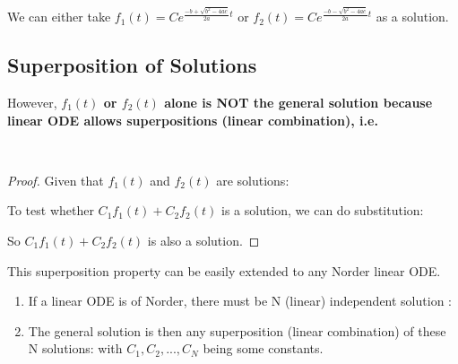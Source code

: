 \documentclass[class=article, crop=false, 12pt]{standalone}
\begin{document}
We can either take $f_1(t) = Ce^{\frac{-b+ \sqrt{b^2-4ac}}{2a} t}$ or 
$f_2(t) = Ce^{\frac{-b- \sqrt{b^2-4ac}}{2a} t}$ as a solution. 

\subsection{Superposition of Solutions}

However, \bf{$f_1(t)$ or $f_2(t)$ alone is NOT the general solution}
because linear ODE allows superpositions (linear combination), i.e. 
\begin{center}
\end{center}

\hfill\\[-3em]

\begin{proof}
    Given that $f_1(t)$ and $f_2(t)$ are solutions:

    To test whether $C_1f_1(t)+C_2f_2(t)$ is a solution, we can do substitution:

    So $C_1f_1(t)+C_2f_2(t)$ is also a solution.
\end{proof}

\begin{notation}
    This superposition property can be easily extended to any N\Nth order linear ODE. 
    \begin{enumerate}
        \item If a linear ODE is of N\Nth order, 
        there must be N (linear) independent solution :

        \item The general solution is then any superposition (linear combination) of these N solutions:
        with $C_1, C_2,...,C_N$ being some constants.
    \end{enumerate}
\end{notation}
\end{document}
